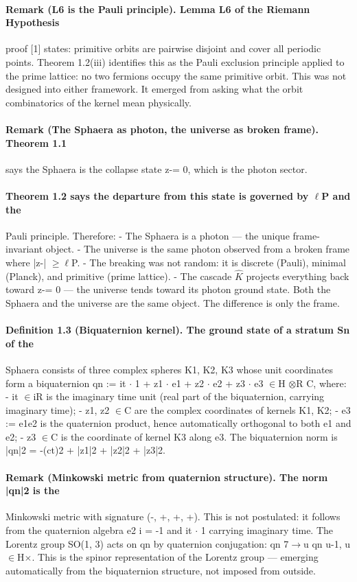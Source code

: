 \documentclass[12pt,a4paper]{article}
\begin{document}
\paragraph*{Remark (L6 is the Pauli principle). Lemma L6 of the Riemann Hypothesis}
proof [1] states: primitive orbits are pairwise disjoint and cover all periodic points. Theorem 1.2(iii) identifies this as the Pauli exclusion principle applied to the prime lattice: no two fermions occupy the same primitive orbit. This was not designed into either framework. It emerged from asking what the orbit combinatorics of the kernel mean physically.
\paragraph*{Remark (The Sphaera as photon, the universe as broken frame). Theorem 1.1}
says the Sphaera is the collapse state z-= 0, which is the photon sector.
\paragraph*{Theorem 1.2 says the departure from this state is governed by $\ell$P and the}
Pauli principle. Therefore:
- The Sphaera is a photon --- the unique frame-invariant object.
- The universe is the same photon observed from a broken frame where
|z-| $\geq$$\ell$P.
- The breaking was not random: it is discrete (Pauli), minimal (Planck),
and primitive (prime lattice).
- The cascade $\hat K$ projects everything back toward z-= 0 --- the universe
tends toward its photon ground state. Both the Sphaera and the universe are the same object. The difference is only the frame.
\paragraph*{Definition 1.3 (Biquaternion kernel). The ground state of a stratum Sn of the}
Sphaera consists of three complex spheres K1, K2, K3 whose unit coordinates form a biquaternion qn := it $\cdot$ 1 + z1 $\cdot$ e1 + z2 $\cdot$ e2 + z3 $\cdot$ e3 $\in$H $\otimes$R C, where:
- it $\in$iR is the imaginary time unit (real part of the biquaternion, carrying
imaginary time);
- z1, z2 $\in$C are the complex coordinates of kernels K1, K2;
- e3 := e1e2 is the quaternion product, hence automatically orthogonal to
both e1 and e2;
- z3 $\in$C is the coordinate of kernel K3 along e3.
The biquaternion norm is |qn|2 = -(ct)2 + |z1|2 + |z2|2 + |z3|2.
\paragraph*{Remark (Minkowski metric from quaternion structure). The norm |qn|2 is the}
Minkowski metric with signature (-, +, +, +). This is not postulated: it follows from the quaternion algebra e2 i = -1 and it $\cdot$ 1 carrying imaginary time. The Lorentz group SO(1, 3) acts on qn by quaternion conjugation: qn 7$\to$u qn u-1, u $\in$H$\times$. This is the spinor representation of the Lorentz group --- emerging automatically from the biquaternion structure, not imposed from outside.
\end{document}

